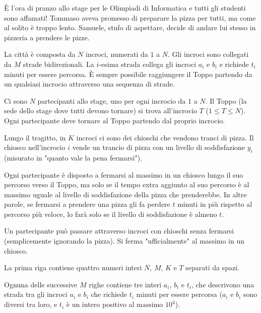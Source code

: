 \usepackage{xcolor}
\usepackage{afterpage}
\usepackage{pifont,mdframed}
\usepackage[bottom]{footmisc}

\newcommand{\inputfile}{\texttt{stdin}}
\newcommand{\outputfile}{\texttt{stdout}}
\makeatletter
\renewcommand{\this@inputfilename}{\texttt{stdin}}
\renewcommand{\this@outputfilename}{\texttt{stdout}}
\makeatother

È l'ora di pranzo allo stage per le Olimpiadi di Informatica e tutti gli studenti sono affamati! Tommaso aveva promesso di preparare la pizza per tutti, ma come al solito è troppo lento. Samuele, stufo di aspettare, decide di andare lui stesso in pizzeria a prendere le pizze.

La città è composta da $N$ incroci, numerati da $1$ a $N$. Gli incroci sono collegati da $M$ strade bidirezionali. La $i$-esima strada collega gli incroci $a_i$ e $b_i$ e richiede $t_i$ minuti per essere percorsa. È sempre possibile raggiungere il Toppo partendo da un qualsiasi incrocio attraverso una sequenza di strade.

Ci sono $N$ partecipanti allo stage, uno per ogni incrocio da $1$ a $N$. Il Toppo (la sede dello stage dove tutti devono tornare) si trova all'incrocio $T$ ($1 \le T \le N$). Ogni partecipante deve tornare al Toppo partendo dal proprio incrocio.

Lungo il tragitto, in $K$ incroci ci sono dei chioschi che vendono tranci di pizza. Il chiosco nell'incrocio $i$ vende un trancio di pizza con un livello di soddisfazione $y_i$ (misurato in "quanto vale la pena fermarsi").

Ogni partecipante è disposto a fermarsi al massimo in un chiosco lungo il suo percorso verso il Toppo, ma solo se il tempo extra aggiunto al suo percorso è al massimo uguale al livello di soddisfazione della pizza che prenderebbe. In altre parole, se fermarsi a prendere una pizza gli fa perdere $t$ minuti in più rispetto al percorso più veloce, lo farà solo se il livello di soddisfazione è almeno $t$.

\begin{warning}
Un partecipante può passare attraverso incroci con chioschi senza fermarsi (semplicemente ignorando la pizza). Si ferma "ufficialmente" al massimo in un chiosco.
\end{warning}

\InputFile
La prima riga contiene quattro numeri interi $N$, $M$, $K$ e $T$ separati da spazi.

Ognuna delle successive $M$ righe contiene tre interi $a_i$, $b_i$ e $t_i$, che descrivono una strada tra gli incroci $a_i$ e $b_i$ che richiede $t_i$ minuti per essere percorsa ($a_i$ e $b_i$ sono diversi tra loro, e $t_i$ è un intero positivo al massimo $10^4$).

